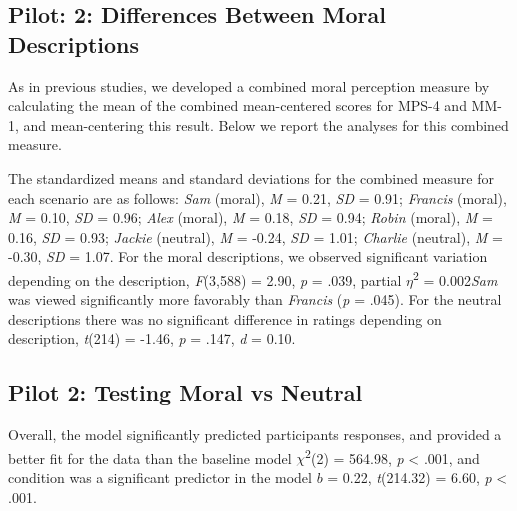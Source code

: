 \documentclass[
  american,
  man,floatsintext]{apa7}
\begin{document}
\hypertarget{pilot-2-differences-between-moral-descriptions}{%
\subsection{Pilot: 2: Differences Between Moral Descriptions}\label{pilot-2-differences-between-moral-descriptions}}

As in previous studies, we developed a combined moral perception measure by calculating the mean of the combined mean-centered scores for MPS-4 and MM-1, and mean-centering this result. Below we report the analyses for this combined measure.

The standardized means and standard deviations for the combined measure for each scenario are as follows:
\emph{Sam} (moral),
\emph{M} = 0.21, \emph{SD} = 0.91;
\emph{Francis} (moral),
\emph{M} = 0.10, \emph{SD} = 0.96;
\emph{Alex} (moral),
\emph{M} = 0.18, \emph{SD} = 0.94;
\emph{Robin} (moral),
\emph{M} = 0.16, \emph{SD} = 0.93;
\emph{Jackie} (neutral),
\emph{M} = -0.24, \emph{SD} = 1.01;
\emph{Charlie} (neutral),
\emph{M} = -0.30, \emph{SD} = 1.07. For the moral descriptions, we observed significant variation depending on the description, \emph{F}(3,588) = 2.90, \emph{p} = .039, partial \(\eta\)\textsuperscript{2} = 0.002\emph{Sam} was viewed significantly more favorably than \emph{Francis} (\emph{p} = .045). For the neutral descriptions there was no significant difference in ratings depending on description, \emph{t}(214) = -1.46, \emph{p} = .147, \emph{d} = 0.10.

\newpage

\hypertarget{pilot-2-testing-moral-vs-neutral}{%
\subsection{Pilot 2: Testing Moral vs Neutral}\label{pilot-2-testing-moral-vs-neutral}}

Overall, the model significantly predicted participants responses, and provided a better fit for the data than the baseline model \(\chi\)\textsuperscript{2}(2) = 564.98, \emph{p} \textless{} .001, and condition was a significant predictor in the model \(b\) = 0.22, \emph{t}(214.32) = 6.60, \emph{p} \textless{} .001.
\end{document}
